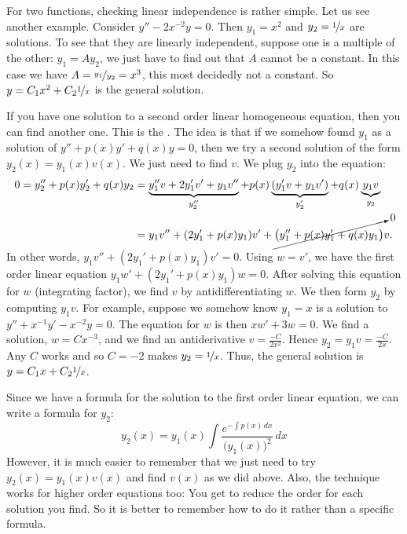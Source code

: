 For two functions, checking linear independence is rather simple.  Let us
see another example.  Consider $y''-2x^{-2}y = 0$.  Then $y_1 = x^2$ and $y_2 =
\nicefrac{1}{x}$ are solutions.  To see that they are linearly independent,
suppose one is a multiple of the other: $y_1 = A y_2$, we just have to find
out that $A$ cannot be a constant.  In this case we have $A =
\nicefrac{y_1}{y_2} = x^3$, this most decidedly not a constant.
So $y = C_1 x^2 + C_2 \nicefrac{1}{x}$ is the general solution.

\medskip

If you have one solution to a second order linear homogeneous
equation, then you can find another one.  This is the \emph{}.  The idea is that if we somehow found $y_1$ as a solution of
$y'' + p(x) y' + q(x) y = 0$, then we try a second
solution of the form $y_2(x) = y_1(x) v(x)$.
We just need to find $v$.  We plug $y_2$ into the equation:
\begin{equation*}
\begin{split}
0 = 
y_2'' + p(x) y_2' + q(x) y_2
& =
\underbrace{y_1'' v + 2 y_1' v' + y_1 v''}_{y_2''}
+ p(x) \underbrace{( y_1' v + y_1 v' )}_{y_2'}
+ q(x) \underbrace{y_1 v}_{y_2}
\\
& =
y_1 v''
+ (2 y_1' + p(x) y_1) v'
+
\cancelto{0}{\bigl( y_1'' + p(x) y_1' + q(x) y_1 \bigr)} v .
\end{split}
\end{equation*}
In other words,
$y_1 v'' + (2 y_1' + p(x) y_1) v' = 0$.  Using $w = v'$, we have the
first order linear equation
$y_1 w' + (2 y_1' + p(x) y_1) w = 0$.  After solving this equation for $w$
(integrating factor),
we find $v$ by antidifferentiating $w$.  We then form $y_2$ by computing
$y_1 v$.  For example, suppose we somehow know $y_1 = x$ is a solution
to $y''+x^{-1}y'-x^{-2} y=0$.
The equation for $w$ is then
$xw' + 3 w = 0$.  We find a solution, $w = Cx^{-3}$, and we find an 
antiderivative $v = \frac{-C}{2x^2}$.
Hence $y_2 = y_1 v = \frac{-C}{2x}$.
Any $C$ works and so $C=-2$ makes $y_2 = \nicefrac{1}{x}$.  Thus, the
general solution is $y = C_1 x + C_2\nicefrac{1}{x}$.

Since we have a formula for the solution to the first order linear equation,
we can write a formula for $y_2$:
\begin{equation*}
y_2(x) = y_1(x) \int \frac{e^{-\int p(x)\,dx}}{{\bigl(y_1(x)\bigr)}^2} \,dx
\end{equation*}
However, it is much easier to remember that we just need to try $y_2(x) =
y_1(x) v(x)$ and find $v(x)$ as we did above.  Also, the technique
works for higher order equations too: You get to reduce the order for each
solution you find.  So it is better to remember how to do
it rather than a specific formula.

